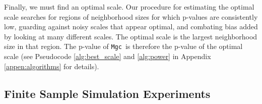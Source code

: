 \documentclass[11pt]{article}
\providecommand{\sct}[1]{{\sc \texttt{#1}}}
\newcommand{\G}{C}
\newcommand{\Mgc}{\sct{Mgc}}
\newcommand{\Mcorr}{\sct{Mcorr}}
\begin{document}
Finally, we must find an optimal scale.
Our procedure for estimating the optimal scale searches for regions of neighborhood sizes for which p-values are consistently low, guarding against noisy scales that appear optimal, and combating bias added by looking at many different scales.
%
The optimal scale is the largest neighborhood size in that region.
The p-value of \Mgc~is therefore the p-value of the optimal scale 
(see Pseudocode \ref{alg:best_scale} and \ref{alg:power} in Appendix \ref{appen:algorithms} for details).



\subsection*{Finite Sample Simulation Experiments}

\end{document}
